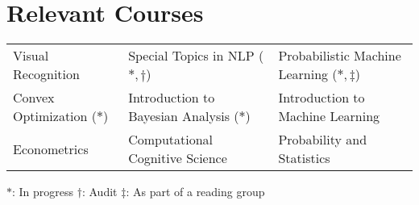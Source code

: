\setlength\extrarowheight{3pt}  %

\section*{Relevant Courses}
\begin{tabularx}{\textwidth}{L L L}
    Visual Recognition &
    Special Topics in NLP ($\ast, \dagger$) &
    Probabilistic Machine Learning ($\ast, \ddagger$)\\
    Convex Optimization ($\ast$) &
    Introduction to Bayesian Analysis ($\ast$) &
    Introduction to Machine Learning \\
    Econometrics &
    Computational Cognitive Science &
    Probability and Statistics
\end{tabularx}

\vspace{2mm}
{\small $\ast$: In progress \hspace{5mm} $\dagger$: Audit \hspace{5mm} $\ddagger$: As part of a reading group}
